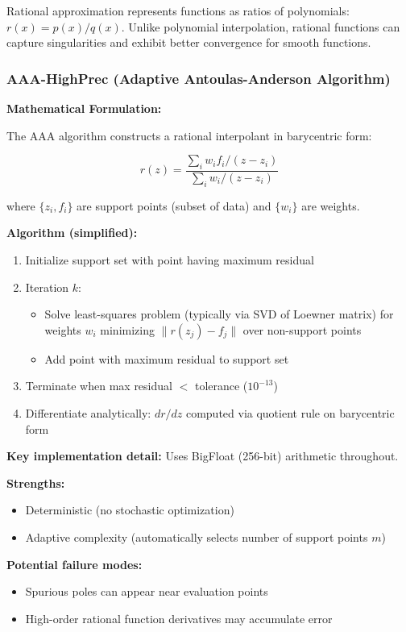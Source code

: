 Rational approximation represents functions as ratios of polynomials: $r(x) = p(x)/q(x)$. Unlike polynomial interpolation, rational functions can capture singularities and exhibit better convergence for smooth functions.

\subsubsection{AAA-HighPrec (Adaptive Antoulas-Anderson Algorithm)}

\textbf{Mathematical Formulation:}

The AAA algorithm constructs a rational interpolant in barycentric form:

\begin{equation}
r(z) = \frac{\sum_i w_i f_i / (z - z_i)}{\sum_i w_i / (z - z_i)}
\end{equation}

where $\{z_i, f_i\}$ are support points (subset of data) and $\{w_i\}$ are weights.

\textbf{Algorithm (simplified):}
\begin{enumerate}
    \item Initialize support set with point having maximum residual
    \item Iteration $k$:
    \begin{itemize}
        \item Solve least-squares problem (typically via SVD of Loewner matrix) for weights $w_i$ minimizing $\|r(z_j) - f_j\|$ over non-support points
        \item Add point with maximum residual to support set
    \end{itemize}
    \item Terminate when max residual $< $ tolerance ($10^{-13}$)
    \item Differentiate analytically: $dr/dz$ computed via quotient rule on barycentric form
\end{enumerate}

\textbf{Key implementation detail:} Uses BigFloat (256-bit) arithmetic throughout.

\textbf{Strengths:}
\begin{itemize}
    \item Deterministic (no stochastic optimization)
    \item Adaptive complexity (automatically selects number of support points $m$)
\end{itemize}

\textbf{Potential failure modes:}
\begin{itemize}
    \item Spurious poles can appear near evaluation points
    \item High-order rational function derivatives may accumulate error
\end{itemize}

